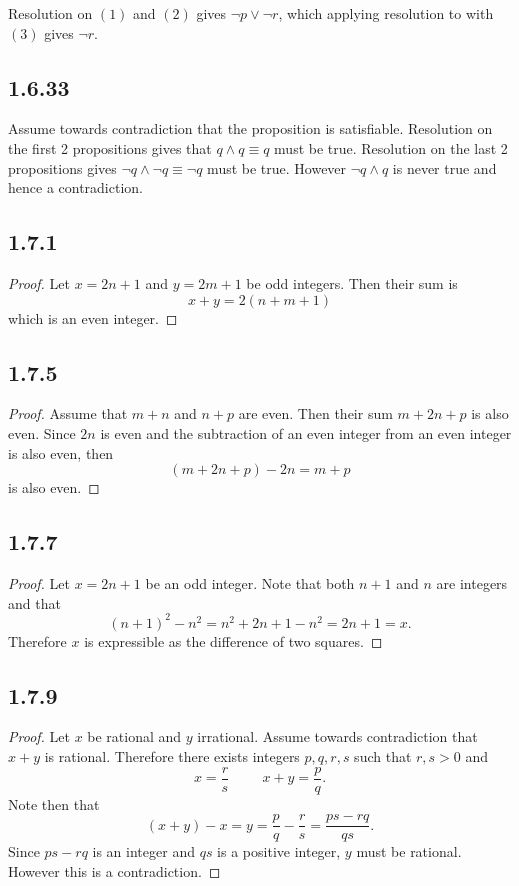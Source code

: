 \documentclass[12pt,titlepage]{extarticle}
\begin{document}
Resolution on $(1)$ and $(2)$ gives $\lnot p \lor \lnot r$, which applying resolution to with $(3)$ gives $\lnot r$.

\subsection*{1.6.33}
Assume towards contradiction that the proposition is satisfiable. Resolution on the first 2 propositions gives that $q \land q \equiv q$ must be true. Resolution on the last 2 propositions gives $\lnot q \land \lnot q \equiv \lnot q$ must be true. However $\lnot q \land q$ is never true and hence a contradiction.

\subsection*{1.7.1}
\begin{proof}
    Let $x = 2n + 1$ and $y = 2m + 1$ be odd integers. Then their sum is
    \[
        x + y = 2(n + m + 1)
    \]
    which is an even integer.
\end{proof}

\subsection*{1.7.5}
\begin{proof}
    Assume that $m + n$ and $n + p$ are even. Then their sum $m + 2n + p$ is also even. Since $2n$ is even and the subtraction of an even integer from an even integer is also even, then
    \[
        (m + 2n + p) - 2n = m + p
    \]
    is also even.
\end{proof}

\subsection*{1.7.7}
\begin{proof}
    Let $x = 2n + 1$ be an odd integer. Note that both $n + 1$ and $n$ are integers and that
    \[
        (n+1)^2 - n^2 = n^2 + 2n + 1 - n^2 = 2n + 1 = x
    .\]
    Therefore $x$ is expressible as the difference of two squares.
\end{proof}

\subsection*{1.7.9}
\begin{proof}
    Let $x$ be rational and $y$ irrational. Assume towards contradiction that $x + y$ is rational. Therefore there exists integers $p, q, r, s$ such that $r,s > 0$ and
    \[
        x = \frac{r}{s} \hspace{1cm} x + y = \frac{p}{q}
    .\]
    Note then that
    \[
        (x+y) - x = y = \frac{p}{q} - \frac{r}{s} = \frac{ps - rq}{qs}
    .\]
    Since $ps - rq$ is an integer and $qs$ is a positive integer, $y$ must be rational. However this is a contradiction.
\end{proof}
\end{document}
